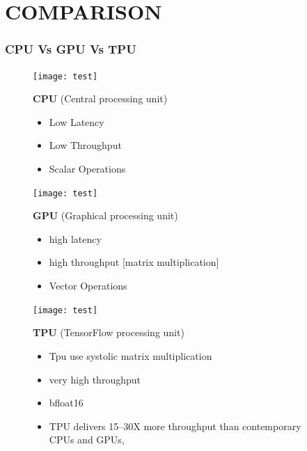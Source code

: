 \documentclass[c]{beamer}
\begin{document}
	\section{COMPARISON}               
    \begin{frame} [c]
    \frametitle{CPU Vs GPU Vs TPU}
\begin{figure}[ht]
  {\begin{minipage}[t]{105pt}
    \texttt{[image: test]}
    \begin{center}{\LARGE \textbf{CPU}}\newline
    {\footnotesize (Central processing unit)}
    \end{center}
    \begin{itemize}
        \item  Low Latency 
        \item Low Throughput
        \item Scalar Operations
\end{itemize}
  \end{minipage}}
  \hfill
  {\begin{minipage}[t]{112.5pt}
    \texttt{[image: test]}
    \begin{center}{\LARGE \textbf{GPU}}\newline
    {\footnotesize (Graphical processing unit)}
    \end{center}
    \begin{itemize}
        \item  high latency
        \item high throughput [matrix multiplication]
        \item Vector Operations
    \end{itemize}
  \end{minipage}}
  {\begin{minipage}[t]{118pt}
    \texttt{[image: test]}
    \begin{center}{\LARGE \textbf{TPU}}\newline
    {\footnotesize (TensorFlow processing unit)}
    \end{center}
    \begin{itemize}
        \item Tpu  use systolic matrix multiplication
        \item very high throughput 
        \item bfloat16
        \item TPU delivers 15–30X more throughput than contemporary CPUs and GPUs,
        \end{itemize}
  \end{minipage}}
\end{figure}
	\end{frame}
\end{document}
